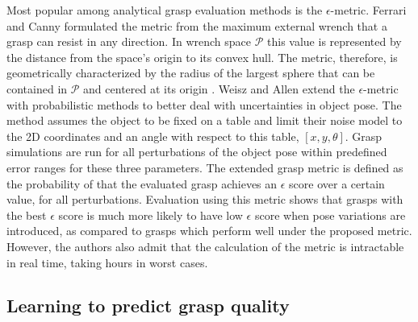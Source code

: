 Most popular among analytical grasp evaluation methods is the $\epsilon$-metric. Ferrari and Canny
\cite{FerrariCanny1992} formulated the metric from the maximum external wrench that a grasp can resist in any
direction. In wrench space $ \mathcal{P} $ this value is represented by the distance from the space's origin to its
convex hull. The metric, therefore, is geometrically characterized by the radius of the largest sphere that can be
contained in $ \mathcal{P} $ and centered at its origin \cite{Roa2015}. Weisz and Allen \cite{WeiszAllen2012} extend
the $\epsilon$-metric with probabilistic methods to better deal with uncertainties in object pose. The method assumes
the object to be fixed on a table and limit their noise model to the 2D coordinates and an angle with respect to this
table, $ [x, y, \theta] $. Grasp simulations are run for all perturbations of the object pose within predefined error
ranges for these three parameters. The extended grasp metric is defined as the probability of that the evaluated
grasp achieves an $ \epsilon $ score over a certain value, for all perturbations. Evaluation using this metric shows
that grasps with the best $ \epsilon $ score is much more likely to have low $ \epsilon $ score when pose variations
are introduced, as compared to grasps which perform well under the proposed metric. However, the authors also admit
that the calculation of the metric is intractable in real time, taking hours in worst cases.

\subsection{Learning to predict grasp quality}


